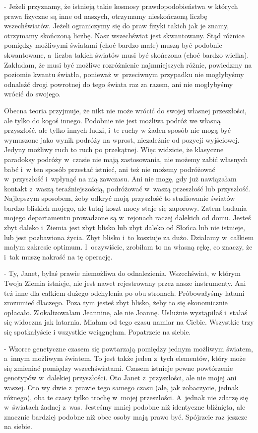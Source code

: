 \documentclass[oneside,polish,12pt,sfheadings]{mwbk}
\begin{document}
- Jeżeli przyznamy, że istnieją takie kosmosy prawdopodobieństwa w
których prawa fizyczne są inne od naszych, otrzymamy nieskończoną
liczbę wszechświatów. Jeżeli ograniczymy się do praw fizyki takich
jak je znamy, otrzymamy skończoną liczbę. Nasz wszechświat jest skwantowany.
Stąd różnice pomiędzy możliwymi światami (choć bardzo małe) muszą
być podobnie skwantowane, a~liczba takich światów musi być skończona
(choć bardzo wielka). Zakładam, że musi być możliwe rozróżnienie najmniejszych
różnic, powiedzmy na poziomie kwantu światła, ponieważ w~przeciwnym
przypadku nie mogłybyśmy odnaleźć drogi powrotnej do tego świata raz
za razem, ani nie mogłybyśmy wrócić do swojego.

Obecna teoria przyjmuje, że nikt nie może wrócić do swojej własnej
przeszłości, ale tylko do kogoś innego. Podobnie nie jest możliwa
podróż we własną przyszłość, ale tylko innych ludzi, i~te ruchy w
żaden sposób nie mogą być wymuszone jako wynik podróży na wprost,
niezależnie od pozycji wyjściowej. Jedyny możliwy ruch to ruch po
przekątnej. Więc widzicie, że klasyczne paradoksy podróży w~czasie
nie mają zastosowania, nie możemy zabić własnych babć i~w ten sposób
przestać istnieć, ani też nie możemy podróżować w~przyszłość i~wpłynąć
na nią zawczasu. Ani nie mogę, gdy już nawiązałam kontakt z~waszą
teraźniejszością, podróżować w~waszą przeszłość lub przyszłość. Najlepszym
sposobem, żeby odkryć moją przyszłość to studiowanie światów bardzo
bliskich mojego, ale tutaj koszt mocy staje się zaporowy. Zatem badania
mojego departamentu prowadzone są w~rejonach raczej dalekich od domu.
Jesteś zbyt daleko i~Ziemia jest zbyt blisko lub zbyt daleko od Słońca
lub nie istnieje, lub jest pozbawiona życia. Zbyt blisko i~to kosztuje
za dużo. Działamy w~całkiem małym zakresie optimum. I~oczywiście,
zrobiłam to na własną rękę, co znaczy, że i~tak muszę nakraść na tę
operację.

- Ty, Janet, byłaś prawie niemożliwa do odnalezienia. Wszechświat,
w którym Twoja Ziemia istnieje, nie jest nawet rejestrowany przez
nasze instrumenty. Ani też inne dla całkiem dużego odchylenia po obu
stronach. Próbowałyśmy latami zrozumieć dlaczego. Poza tym jesteś
zbyt blisko, żeby to się ekonomicznie opłacało. Zlokalizowałam Jeannine,
ale nie Joannę. Usłużnie wystąpiłaś i~stałaś się widoczna jak latarnia.
Miałam od tego czasu namiar na Ciebie. Wszystkie trzy się spotkałyście
i wszystkie wciągnęłam. Popatrzcie na siebie.

- Wzorce genetyczne czasem się powtarzają pomiędzy jednym możliwym
światem, a~innym możliwym światem. To jest także jeden z~tych elementów,
który może się zmieniać pomiędzy wszechświatami. Czasem istnieje pewne
powtórzenie genotypów w~dalekiej przyszłości. Oto Janet z~przyszłości,
ale nie mojej ani waszej. Oto wy dwie z~prawie tego samego czasu (ale,
jak zobaczycie, jednak różnego), oba te czasy tylko trochę w~mojej
przeszłości. A~jednak nie zdarzę się w~światach żadnej z~was. Jesteśmy
mniej podobne niż identyczne bliźnięta, ale znacznie bardziej podobne
niż obce osoby mają prawo być. Spójrzcie raz jeszcze na siebie.
\end{document}
